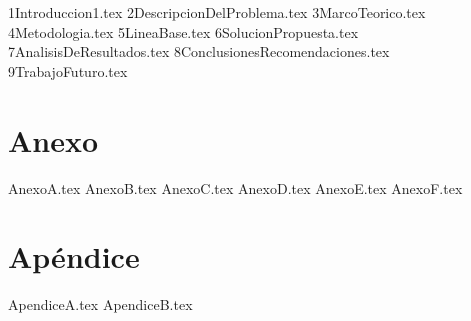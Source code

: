 \documentclass[12pt,letterpaper,oneside]{book}
\newcommand{\capitulo}[1]{{#1.tex}}
\newcommand{\apendice}[1]{{#1.tex}}
\newcommand{\anexo}[1]{{#1.tex}}
\begin{document}
\frontmatter

\clearpage
\thispagestyle{empty}

\clearpage
\thispagestyle{empty}
\tableofcontents
\thispagestyle{empty}
\clearpage

\setcounter{page}{1}
\listoffigures
{}
\clearpage
\listoftables
{}
\clearpage

\mainmatter

\capitulo{1Introduccion1}
\capitulo{2DescripcionDelProblema}
\capitulo{3MarcoTeorico}
\capitulo{4Metodologia}
\capitulo{5LineaBase}
\capitulo{6SolucionPropuesta}
\capitulo{7AnalisisDeResultados}
\capitulo{8ConclusionesRecomendaciones}
\capitulo{9TrabajoFuturo}
\lipsum[1]
\chapter*{Anexo}
\renewcommand{\thesection}{\Alph{section}}
\anexo{AnexoA}
\anexo{AnexoB}
\anexo{AnexoC}
\anexo{AnexoD}
\anexo{AnexoE}
\anexo{AnexoF}
\appendix
{}
\chapter*{Apéndice}
\apendice{ApendiceA}
\apendice{ApendiceB}
\backmatter


\end{document}
